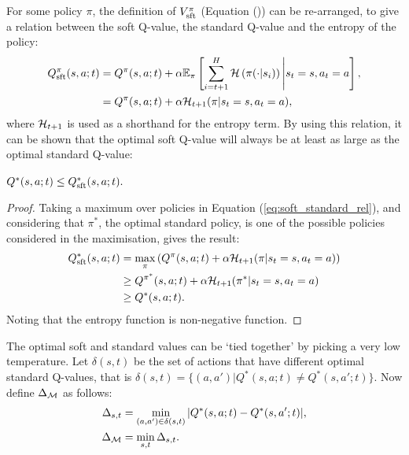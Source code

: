 
            For some policy $\pi$, the definition of $V^{\pi}_{{\textnormal{sft}}}$ (Equation ()) can be re-arranged, to give a relation between the soft Q-value, the standard Q-value and the entropy of the policy:
            \begin{align}
                Q^{\pi}_{{\textnormal{sft}}}(s,a;t) &= Q^{\pi}(s,a;t) 
                    + \alpha \mathbb{E}_{\pi}\left[
                        \sum_{i=t+1}^H \mathcal{H}\left(\pi(\cdot|s_i)\right) \Bigg| s_t=s, a_t=a
                        \right],  \\
                    &= Q^{\pi}(s,a;t) 
                    + \alpha\mathcal{H}_{t+1}(\pi|s_t=s,a_t=a), \label{eq:soft_standard_rel}
            \end{align}
            where $\mathcal{H}_{t+1}$ is used as a shorthand for the entropy term. By using this relation, it can be shown that the optimal soft Q-value will always be at least as large as the optimal standard Q-value:
            \begin{lemma} \label{lem:soft_geq_standard}
                $Q^*(s,a;t) \leq Q_{\textnormal{sft}}^*(s,a;t).$
            \end{lemma}
            \begin{proof}
                Taking a maximum over policies in Equation (\ref{eq:soft_standard_rel}), and considering that $\pi^*$, the optimal standard policy, is one of the possible policies considered in the maximisation, gives the result:
                \begin{align}
                    Q_{{\textnormal{sft}}}^*(s,a;t) &= \max_\pi \left(Q^{\pi}(s,a;t) + \alpha\mathcal{H}_{t+1}(\pi|s_t=s,a_t=a)\right) \\
                        &\geq Q^{\pi^*}(s,a;t) + \alpha\mathcal{H}_{t+1}(\pi^*|s_t=s,a_t=a) \\
                        &\geq Q^*(s,a;t).
                \end{align} 
                Noting that the entropy function is non-negative function.
            \end{proof}








            The optimal soft and standard values can be `tied together' by picking a very low temperature. Let $\delta(s,t)$ be the set of actions that have different optimal standard Q-values, that is $\delta(s,t)=\{(a,a')|Q^*(s,a;t)\neq Q^*(s,a';t)\}$. Now define $\Delta_{\mathcal{M}}$ as follows:
            \begin{align}
                \Delta_{s,t} &= \min_{(a,a')\in\delta(s,t)} |Q^*(s,a;t)-Q^*(s,a';t)|, \\
                \Delta_{\mathcal{M}} &= \min_{s,t} \Delta_{s,t}. \label{eq:delta}
            \end{align}
        
